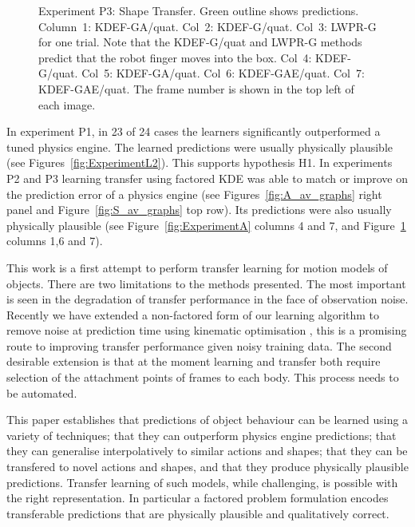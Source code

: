 \begin{figure}[tbp]
\caption {Experiment P3: Shape Transfer. Green outline shows predictions. Column~1: KDEF-GA/quat.
  Col~2: KDEF-G/quat. Col~3: LWPR-G for one trial.  Note that the
  KDEF-G/quat and LWPR-G methods predict that the robot finger moves
  into the box.  Col~4: KDEF-G/quat. Col~5: KDEF-GA/quat. Col~6:
  KDEF-GAE/quat. Col~7: KDEF-GAE/quat. The frame number is shown in
  the top left of each image.  }
\label{fig:ExperimentStransfer}
\end{figure}

 In experiment P1, in 23 of 24 cases the learners significantly outperformed a tuned physics engine. The learned predictions were usually physically plausible (see Figures~\ref{fig:ExperimentL2}). This supports hypothesis H1. In experiments P2 and P3 learning transfer using factored KDE was able to match or improve on the prediction error of a physics engine (see Figures~\ref{fig:A_av_graphs} right panel and Figure~\ref{fig:S_av_graphs} top row). Its predictions were also usually physically plausible (see Figure~\ref{fig:ExperimentA} columns 4 and 7, and Figure~\ref{fig:ExperimentStransfer} columns 1,6 and 7).

 This work is a first attempt to perform transfer learning for motion models of objects. There are two limitations to the methods presented. The most important is seen in the degradation of transfer performance in the face of observation noise. Recently we have extended a non-factored form of our learning algorithm to remove noise at prediction time using kinematic optimisation \cite{belter2014iros}, this is a promising route to improving transfer performance given noisy training data. The second desirable extension is that at the moment learning and transfer both require selection of the attachment points of frames to each body. This process needs to be automated.

This paper establishes that predictions of object behaviour can be learned using a variety of techniques; that they can outperform physics engine predictions; that they can generalise interpolatively to similar actions and shapes; that they can be transfered to novel actions and shapes, and that they produce physically plausible predictions. Transfer learning of such models, while challenging, is possible with the right representation.  In particular a factored problem formulation encodes transferable predictions that are physically plausible and qualitatively correct.